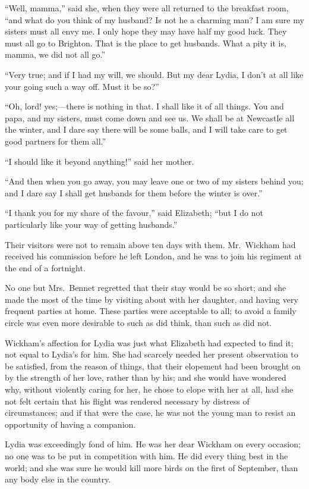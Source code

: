 ``Well, mamma,'' said she, when they were all returned to the
breakfast room, ``and what do you think of my husband?  Is not
he a charming man?  I am sure my sisters must all envy me.  I
only hope they may have half my good luck.  They must all go to
Brighton.  That is the place to get husbands.  What a pity it
is, mamma, we did not all go.''

``Very true; and if I had my will, we should.  But my dear
Lydia, I don't at all like your going such a way off.  Must
it be so?''

``Oh, lord! yes;---there is nothing in that.  I shall like it
of all things.  You and papa, and my sisters, must come down
and see us.  We shall be at Newcastle all the winter, and I
dare say there will be some balls, and I will take care to get
good partners for them all.''

``I should like it beyond anything!'' said her mother.

``And then when you go away, you may leave one or two of my
sisters behind you; and I dare say I shall get husbands for
them before the winter is over.''

``I thank you for my share of the favour,'' said Elizabeth;
``but I do not particularly like your way of getting husbands.''

Their visitors were not to remain above ten days with them.
Mr.\ Wickham had received his commission before he left London,
and he was to join his regiment at the end of a fortnight.

No one but Mrs.\ Bennet regretted that their stay would be so
short; and she made the most of the time by visiting about with
her daughter, and having very frequent parties at home.  These
parties were acceptable to all; to avoid a family circle was
even more desirable to such as did think, than such as did not.

Wickham's affection for Lydia was just what Elizabeth had
expected to find it; not equal to Lydia's for him.  She had
scarcely needed her present observation to be satisfied, from
the reason of things, that their elopement had been brought on
by the strength of her love, rather than by his; and she would
have wondered why, without violently caring for her, he chose
to elope with her at all, had she not felt certain that his
flight was rendered necessary by distress of circumstances;
and if that were the case, he was not the young man to resist
an opportunity of having a companion.

Lydia was exceedingly fond of him.  He was her dear Wickham on
every occasion; no one was to be put in competition with him.
He did every thing best in the world; and she was sure he would
kill more birds on the first of September, than any body else
in the country.

